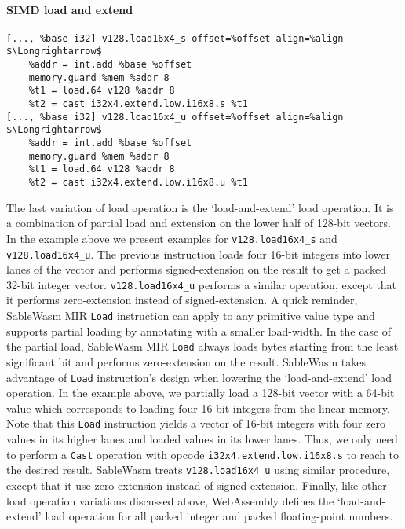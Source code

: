 \paragraph{SIMD load and extend} \quad
\begin{lstlisting}[basicstyle=\linespread{1}\small\ttfamily, language=SableWasmMIR, mathescape=true]
[..., %base i32] v128.load16x4_s offset=%offset align=%align $\Longrightarrow$
    %addr = int.add %base %offset
    memory.guard %mem %addr 8
    %t1 = load.64 v128 %addr 8
    %t2 = cast i32x4.extend.low.i16x8.s %t1
[..., %base i32] v128.load16x4_u offset=%offset align=%align $\Longrightarrow$
    %addr = int.add %base %offset
    memory.guard %mem %addr 8
    %t1 = load.64 v128 %addr 8
    %t2 = cast i32x4.extend.low.i16x8.u %t1
\end{lstlisting}
The last variation of load operation is the `load-and-extend' load operation. It is a combination of partial load and extension on the lower half of 128-bit vectors. In the example above we present examples for \texttt{v128.load16x4\_s} and \texttt{v128.load16x4\_u}. The previous instruction loads four 16-bit integers into lower lanes of the vector and performs signed-extension on the result to get a packed 32-bit integer vector. \texttt{v128.load16x4\_u} performs a similar operation, except that it performs zero-extension instead of signed-extension. A quick reminder, SableWasm MIR \texttt{Load} instruction can apply to any primitive value type and supports partial loading by annotating with a smaller load-width. In the case of the partial load, SableWasm MIR \texttt{Load} always loads bytes starting from the least significant bit and performs zero-extension on the result. SableWasm takes advantage of \texttt{Load} instruction's design when lowering the `load-and-extend' load operation. In the example above, we partially load a 128-bit vector with a 64-bit value which corresponds to loading four 16-bit integers from the linear memory. Note that this \texttt{Load} instruction yields a vector of 16-bit integers with four zero values in its higher lanes and loaded values in its lower lanes. Thus, we only need to perform a \texttt{Cast} operation with opcode \texttt{i32x4.extend.low.i16x8.s} to reach to the desired result. SableWasm treats \texttt{v128.load16x4\_u} using similar procedure, except that it use zero-extension instead of signed-extension. Finally, like other load operation variations discussed above, WebAssembly defines the `load-and-extend' load operation for all packed integer and packed floating-point numbers.

